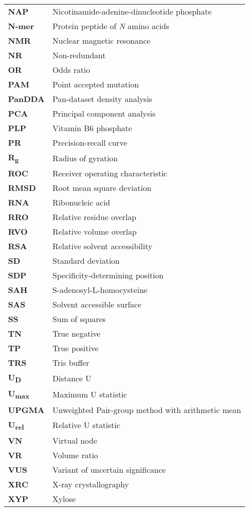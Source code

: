\begin{longtable}[l]{@{}p{2.5cm}p{12cm}@{}}
\textbf{NAP} & Nicotinamide-adenine-dinucleotide phosphate \\
\textbf{N-mer} & Protein peptide of \textit{N} amino acids \\
\textbf{NMR} & Nuclear magnetic resonance \\
\textbf{NR} & Non-redundant \\
\textbf{OR} & Odds ratio \\
\textbf{PAM} & Point accepted mutation \\
\textbf{PanDDA} & Pan-dataset density analysis \\
\textbf{PCA} & Principal component analysis \\
\textbf{PLP} & Vitamin B6 phosphate \\
\textbf{PR} & Precision-recall curve \\
\textbf{R\textsubscript{g}} & Radius of gyration \\
\textbf{ROC} & Receiver operating characteristic \\
\textbf{RMSD} & Root mean square deviation \\
\textbf{RNA} & Ribonucleic acid \\
\textbf{RRO} & Relative residue overlap \\
\textbf{RVO} & Relative volume overlap \\
\textbf{RSA} & Relative solvent accessibility \\
\textbf{SD} & Standard deviation \\
\textbf{SDP} & Specificity-determining position \\
\textbf{SAH} & S-adenosyl-L-homocysteine \\
\textbf{SAS} & Solvent accessible surface \\
\textbf{SS} & Sum of squares \\
\textbf{TN} & True negative \\
\textbf{TP} & True positive \\
\textbf{TRS} & Tris buffer \\
\textbf{U\textsubscript{D}} & Distance U \\
\textbf{U\textsubscript{max}} & Maximum U statistic \\
\textbf{UPGMA} & Unweighted Pair-group method with arithmetic mean \\
\textbf{U\textsubscript{rel}} & Relative U statistic \\
\textbf{VN} & Virtual node \\
\textbf{VR} & Volume ratio \\
\textbf{VUS} & Variant of uncertain significance \\
\textbf{XRC} & X-ray crystallography \\
\textbf{XYP} & Xylose \\

\end{longtable}
